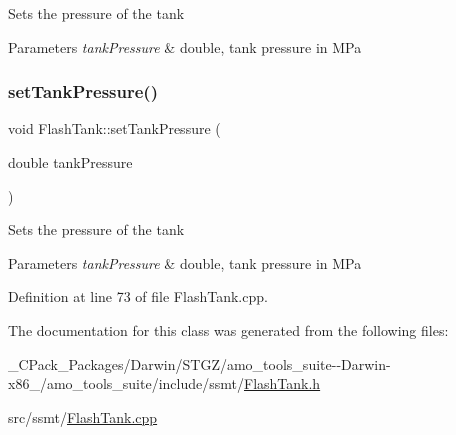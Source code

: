 Sets the pressure of the tank 
\begin{DoxyParams}{Parameters}
{\em tank\+Pressure} & double, tank pressure in M\+Pa \\
\hline
\end{DoxyParams}
\mbox{\label{class_flash_tank_a8b3bb51a62dac4f76284dfdc114d83fe}} 
\subsubsection{\texorpdfstring{set\+Tank\+Pressure()}{setTankPressure()}\hspace{0.1cm}{\footnotesize\ttfamily [3/3]}}
{\footnotesize\ttfamily void Flash\+Tank\+::set\+Tank\+Pressure (\begin{DoxyParamCaption}\item[{double}]{tank\+Pressure }\end{DoxyParamCaption})}

Sets the pressure of the tank 
\begin{DoxyParams}{Parameters}
{\em tank\+Pressure} & double, tank pressure in M\+Pa \\
\hline
\end{DoxyParams}


Definition at line 73 of file Flash\+Tank.\+cpp.



The documentation for this class was generated from the following files\+:\begin{DoxyCompactItemize}
\item 
\+\_\+\+C\+Pack\+\_\+\+Packages/\+Darwin/\+S\+T\+G\+Z/amo\+\_\+tools\+\_\+suite-\/-\/\+Darwin-\/x86\+\_/amo\+\_\+tools\+\_\+suite/include/ssmt/\hyperlink{___c_pack___packages_2_darwin_2_s_t_g_z_2amo__tools__suite--_darwin-x86__64_2amo__tools__suite_2include_2ssmt_2_flash_tank_8h}{Flash\+Tank.\+h}\item 
src/ssmt/\hyperlink{_flash_tank_8cpp}{Flash\+Tank.\+cpp}\end{DoxyCompactItemize}
